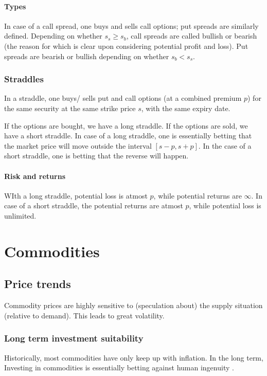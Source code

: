 \documentclass[oneside, article]{memoir}
\begin{document}
\subsubsection{Types}
In case of a call spread, one buys and sells call options; put spreads are similarly defined. Depending on whether $s_s \geq s_b$, call spreads are called bullish or bearish (the reason for which is clear upon considering potential profit and loss). Put spreads are bearish or bullish depending on whether $s_b < s_s$.

\subsection{Straddles}
In a straddle, one buys/ sells put and call options (at a combined premium $p$) for the same security at the same strike price $s$, with the same expiry date.

If the options are bought, we have a long straddle. If the options are sold, we have a short straddle. In case of a long straddle, one is essentially betting that the market price will move outside the interval $[s - p, s + p]$. In the case of a short straddle, one is betting that the reverse will happen.

\subsubsection{Risk and returns}
WIth a long straddle, potential loss is atmost $p$, while potential returns are $\infty$. In case of a short straddle, the potential returns are atmost $p$, while potential loss is unlimited.

\chapter{Commodities}
\section{Price trends}
Commodity prices are highly sensitive to (speculation about) the supply situation (relative to demand). This leads to great volatility.

\subsection{Long term investment suitability}
Historically, most commodities have only keep up with inflation. In the long term, Investing in commodities is essentially betting against human ingenuity .
\end{document}
